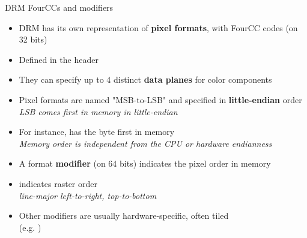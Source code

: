 \begin{frame}[fragile]{DRM FourCCs and modifiers}
  \begin{itemize}
  \item DRM has its own representation of \textbf{pixel formats}, with FourCC codes (on 32 bits)
  \item Defined in the  header
  \item They can specify up to 4 distinct \textbf{data planes} for color components
  \item Pixel formats are named "MSB-to-LSB" and specified in \textbf{little-endian} order\\
  \textit{LSB comes first in memory in little-endian}
  \item For instance,  has the  byte first in memory\\
  \textit{Memory order is independent from the CPU or hardware endianness}
  \item A format \textbf{modifier} (on 64 bits) indicates the pixel order in memory
  \item {} indicates raster order\\
  \textit{line-major left-to-right, top-to-bottom}
  \item Other modifiers are usually hardware-specific, often tiled\\
  (e.g. )
  \end{itemize}
\end{frame}

